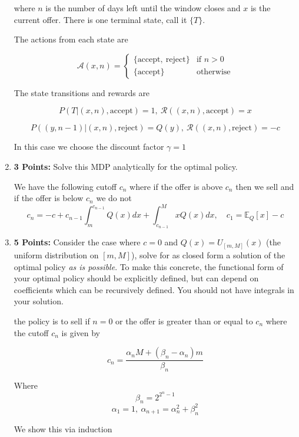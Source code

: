 \documentclass[12pt]{exam}
\begin{document}
\begin{questions}
\begin{enumerate}
\begin{solution}
where $n$ is the number of days left until the window closes and $x$ is the current offer. There is one terminal state, call it $\{T\}$.

The actions from each state are 

\[\mathcal{A}(x, n) = \begin{cases}\{\text{accept},\ \text{reject}\} & \text{if } n > 0\\ \{\text{accept}\} & \text{otherwise} \end{cases}\]

The state transitions and rewards are

\[P(T|(x,n),\text{accept}) = 1,\ \mathcal{R}((x,n),\text{accept}) = x\]

\[P((y, n-1)|(x,n),\text{reject}) = Q(y),\ \mathcal{R}((x,n),\text{reject}) = -c\]

In this case we choose the discount factor $\gamma = 1$

\end{solution}

\item {\bf 3 Points: } Solve this MDP analytically for the optimal policy.

\begin{solution}
We have the following cutoff $c_n$ where if the offer is above $c_n$ then we sell and if the offer is below $c_n$ we do not
\[c_n = -c + c_{n-1} \int_{m}^{c_{n-1}} Q(x)dx + \int_{c_{n-1}}^M x Q(x) dx,\quad c_1 = \mathbb{E}_Q[x]- c\]
\end{solution}

\item {\bf 5 Points: } Consider the case where $c=0$ and $Q(x) = U_{[m,M]}(x)$ (the uniform distribution on $[m,M]$), solve for as closed form a solution of the optimal policy {\em as is possible}. To make this concrete, the functional form of your optimal policy should be explicitly defined, but can depend on coefficients which can be recursively defined. You should not have integrals in your solution.

\begin{solution}

the policy is to sell if $n = 0$ or the offer is greater than or equal to $c_n$ where the cutoff $c_n$ is given by 

\[c_n = \frac{\alpha_n M + (\beta_n - \alpha_n) m}{\beta_n}\]

Where
\[\beta_n = 2^{2^{n} - 1}\]
\[\alpha_1 = 1,\ \alpha_{n+1} = \alpha_n^2 + \beta_n^2\]

We show this via induction


\end{solution}
\end{enumerate}
\end{questions}
\end{document}
